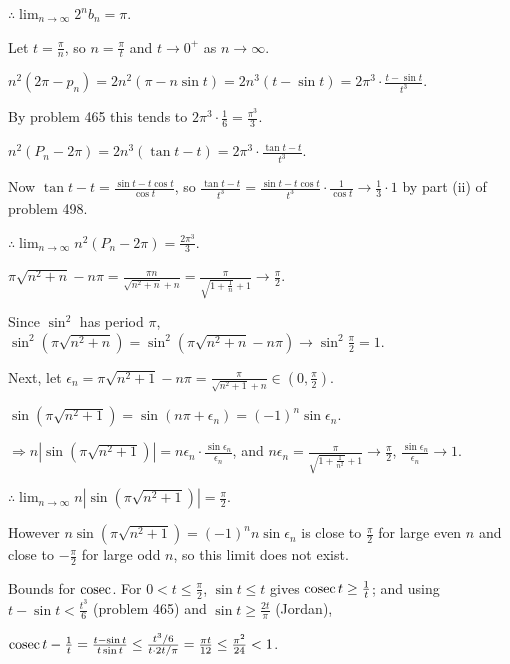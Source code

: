   $\therefore\displaystyle\lim_{n\to\infty}2^nb_n = \pi$.
\item Let $t = \frac{\pi}{n}$, so $n = \frac{\pi}{t}$ and $t\to 0^+$ as $n\to\infty$.

  $n^2(2\pi - p_n) = 2n^2(\pi - n\sin t) = 2n^3(t - \sin t) = 2\pi^3\cdot\frac{t - \sin t}{t^3}$.

  By problem 465 this tends to $2\pi^3\cdot\frac{1}{6} = \frac{\pi^3}{3}$.

  $n^2(P_n - 2\pi) = 2n^3(\tan t - t) = 2\pi^3\cdot\frac{\tan t - t}{t^3}$.

  Now $\tan t - t = \frac{\sin t - t\cos t}{\cos t}$, so $\frac{\tan t - t}{t^3} = \frac{\sin t - t\cos
    t}{t^3}\cdot\frac{1}{\cos t}\to\frac{1}{3}\cdot 1$ by part (ii) of problem 498.

  $\therefore\displaystyle\lim_{n\to\infty}n^2(P_n - 2\pi) = \frac{2\pi^3}{3}$.
\item $\pi\sqrt{n^2 + n} - n\pi = \frac{\pi n}{\sqrt{n^2 + n} + n} = \frac{\pi}{\sqrt{1 + \frac{1}{n}} +
    1}\to\frac{\pi}{2}$.

  Since $\sin^2$ has period $\pi$, $\sin^2\left(\pi\sqrt{n^2 + n}\right) = \sin^2\left(\pi\sqrt{n^2 + n} -
  n\pi\right)\to\sin^2\frac{\pi}{2} = 1$.

  Next, let $\epsilon_n = \pi\sqrt{n^2 + 1} - n\pi = \frac{\pi}{\sqrt{n^2 + 1} + n}\in\left(0,
    \frac{\pi}{2}\right)$.

  $\sin\left(\pi\sqrt{n^2 + 1}\right) = \sin(n\pi + \epsilon_n) = (-1)^n\sin\epsilon_n$.

  $\Rightarrow n\left|\sin\left(\pi\sqrt{n^2 + 1}\right)\right| = n\epsilon_n\cdot\frac{\sin\epsilon_n}{\epsilon_n}$,
  and $n\epsilon_n = \frac{\pi}{\sqrt{1 + \frac{1}{n^2}} + 1}\to\frac{\pi}{2}$, $\frac{\sin\epsilon_n}{\epsilon_n}\to
  1$.

  $\therefore\displaystyle\lim_{n\to\infty}n\left|\sin\left(\pi\sqrt{n^2 + 1}\right)\right| = \frac{\pi}{2}$.

  However $n\sin\left(\pi\sqrt{n^2 + 1}\right) = (-1)^nn\sin\epsilon_n$ is close to $\frac{\pi}{2}$ for large
  even $n$ and close to $-\frac{\pi}{2}$ for large odd $n$, so this limit does not exist.
\item Bounds for ${\rm cosec}$. For $0 < t\leq\frac{\pi}{2}$, $\sin t\leq t$ gives ${\rm cosec}\,t\geq\frac{1}{t}$;
  and using $t - \sin t < \frac{t^3}{6}$ (problem 465) and $\sin t\geq\frac{2t}{\pi}$ (Jordan),

  ${\rm cosec}\,t - \frac{1}{t} = \frac{t - \sin t}{t\sin t}\leq\frac{t^3/6}{t\cdot 2t/\pi} = \frac{\pi
    t}{12}\leq\frac{\pi^2}{24} < 1$.

